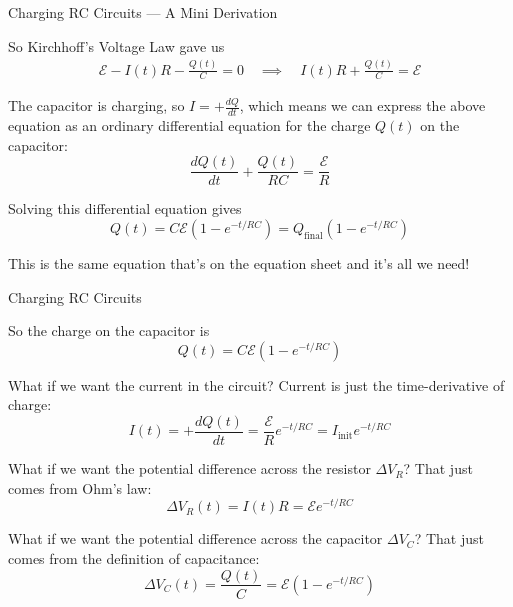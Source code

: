 \documentclass{beamer}
\begin{document}
\begin{frame}{Charging RC Circuits --- A Mini Derivation}

So Kirchhoff's Voltage Law gave us
\begin{gather*}
    \mathscr{E} - I(t) R - \frac{Q(t)}{C} = 0 \quad \implies \quad I(t) R + \frac{Q(t)}{C} = \mathscr{E}
\end{gather*}

The capacitor is charging, so $I = +\frac{dQ}{dt}$, which means we can express the above equation as an ordinary differential equation for the charge $Q(t)$ on the capacitor:
\begin{equation*}
    \frac{dQ(t)}{dt} + \frac{Q(t)}{RC} = \frac{\mathscr{E}}{R}
\end{equation*}

Solving this differential equation gives
\begin{equation*}
    \boxed{Q(t) = C \mathscr{E} \left( 1 - e^{-t/RC} \right) = Q_{\text{final}} \left( 1 - e^{-t/RC}\right)}
\end{equation*}

This is the same equation that's on the equation sheet and it's all we need!

\end{frame}

\begin{frame}{Charging RC Circuits}

So the charge on the capacitor is
\begin{equation*}
    Q(t) = C \mathscr{E} \left( 1 - e^{-t/RC} \right)
\end{equation*}

What if we want the current in the circuit? Current is just the time-derivative of charge:
\begin{equation*}
    I(t) = +\frac{dQ(t)}{dt} = \frac{\mathscr{E}}{R} e^{-t/RC} = I_{\text{init}} e^{-t/RC}
\end{equation*}

What if we want the potential difference across the resistor $\Delta V_R$? That just comes from Ohm's law:
\begin{equation*}
    \Delta V_R (t) = I(t) R = \mathscr{E} e^{-t/RC}
\end{equation*}

What if we want the potential difference across the capacitor $\Delta V_C$? That just comes from the definition of capacitance:
\begin{equation*}
    \Delta V_C (t) = \frac{Q(t)}{C} = \mathscr{E} \left( 1 - e^{-t/RC} \right)
\end{equation*}

\end{frame}
\end{document}

